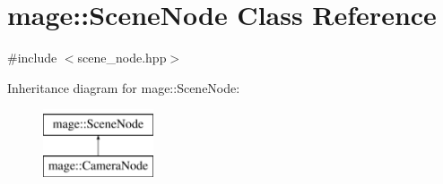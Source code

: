 \hypertarget{classmage_1_1_scene_node}{}\section{mage\+:\+:Scene\+Node Class Reference}
\label{classmage_1_1_scene_node}


{\ttfamily \#include $<$scene\+\_\+node.\+hpp$>$}

Inheritance diagram for mage\+:\+:Scene\+Node\+:\begin{figure}[H]
\begin{center}
\leavevmode
\includegraphics[height=2.000000cm]{classmage_1_1_scene_node}
\end{center}
\end{figure}
